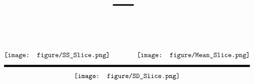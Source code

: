\documentclass[32pt,a4paper]{article}
\author{John Muschelli}
\newcommand*{\Scale}[2][4]{\scalebox{#1}{\raisebox{1.25em}{\ensuremath{#2}}}}%
\newcommand{\thickfrac}[2]{\genfrac{}{}{3pt}{}{#1}{#2}}
\begin{document}
\pagestyle{empty}
$$
\thickfrac{\texttt{[image: figure/SS\_Slice.png]} \Scale[5]{-} \texttt{[image: figure/Mean\_Slice.png]}}{\texttt{[image: figure/SD\_Slice.png]}}
$$
\end{document}
